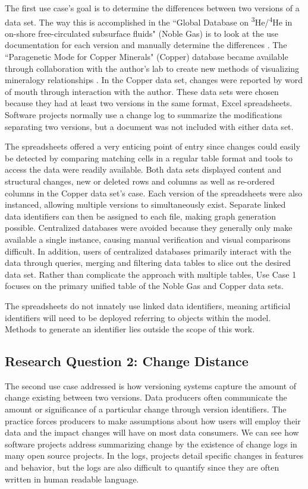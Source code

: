 The first use case's goal is to determine the differences between two versions of a data set.
The way this is accomplished in the ``Global Database on \textsuperscript{3}He/\textsuperscript{4}He in on-shore free-circulated subsurface fluids" (Noble Gas) is to look at the use documentation for each version and manually determine the differences \cite{Polyak2015}.
The ``Paragenetic Mode for Copper Minerals" (Copper) database became available through collaboration with the author's lab to create new methods of visualizing mineralogy relationships \cite{Morrison2016}.
In the Copper data set, changes were reported by word of mouth through interaction with the author.
These data sets were chosen because they had at least two versions in the same format, Excel spreadsheets.
Software projects normally use a change log to summarize the modifications separating two versions, but a document was not included with either data set.

The spreadsheets offered a very enticing point of entry since changes could easily be detected by comparing matching cells in a regular table format and tools to access the data were readily available.
Both data sets displayed content and structural changes, new or deleted rows and columns as well as re-ordered columns in the Copper data set's case.
Each version of the spreadsheets were also instanced, allowing multiple versions to simultaneously exist.
Separate linked data identifiers can then be assigned to each file, making graph generation possible.
Centralized databases were avoided because they generally only make available a single instance, causing manual verification and visual comparisons difficult.
In addition, users of centralized databases primarily interact with the data through queries, merging and filtering data tables to slice out the desired data set.
Rather than complicate the approach with multiple tables, Use Case 1 focuses on the primary unified table of the Noble Gas and Copper data sets.

The spreadsheets do not innately use linked data identifiers, meaning artificial identifiers will need to be deployed referring to objects within the model.
Methods to generate an identifier lies outside the scope of this work.

\subsection{Research Question 2: Change Distance}

The second use case addressed is how versioning systems capture the amount of change existing between two versions.
Data producers often communicate the amount or significance of a particular change through version identifiers.
The practice forces producers to make assumptions about how users will employ their data and the impact changes will have on most data consumers.
We can see how software projects address summarizing change by the existence of change logs in many open source projects.
In the logs, projects detail specific changes in features and behavior, but the logs are also difficult to quantify since they are often written in human readable language.

